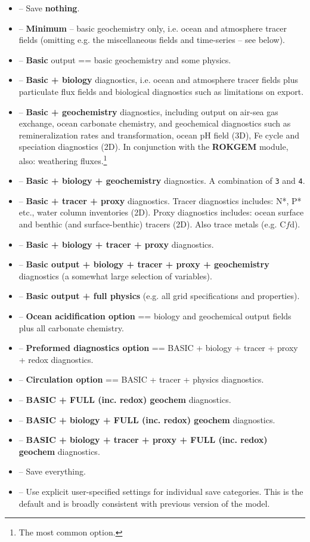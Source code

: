 \documentclass[11pt,fleqn]{book} %
\begin{document}
\vspace{2mm}\begin{itemize}

\item[0] -- Save \textbf{nothing}.
\item[1] -- \textbf{Minimum} -- basic geochemistry only, i.e. ocean and atmosphere tracer fields (omitting e.g. the miscellaneous fields and time-series -- see below).
\item[2] -- \textbf{Basic} output == basic geochemistry and some physics.
\item[3] -- \textbf{Basic + biology} diagnostics, i.e. ocean and atmosphere tracer fields plus particulate  flux fields and biological diagnostics such as limitations on export.
\item[4] -- \textbf{Basic + geochemistry} diagnostics, including output on air-sea gas exchange, ocean carbonate chemistry, and geochemical diagnostics such as remineralization rates and transformation, ocean pH field (3D), Fe cycle and speciation diagnostics (2D). In conjunction with the \textbf{ROKGEM} module, also: weathering fluxes.\footnote{The most common option.} \item[5] -- \textbf{Basic + biology + geochemistry} diagnostics. A combination of \texttt{3} and \texttt{4}.
\item[6] -- \textbf{Basic + tracer + proxy} diagnostics. Tracer diagnostics includes: N*, P* etc., water column inventories (2D). Proxy diagnostics includes: ocean surface and benthic (and surface-benthic) tracers (2D). Also trace metals (e.g. C\(f\)d).\item[7] -- \textbf{Basic + biology + tracer + proxy} diagnostics.
\item[8] -- \textbf{Basic output + biology + tracer + proxy + geochemistry} diagnostics (a somewhat large selection of variables).
\item[9] -- \textbf{Basic output + full physics} (e.g. all grid specifications and properties).
\item[10] -- \textbf{Ocean acidification option} == biology and geochemical output fields plus all carbonate chemistry.
\item[11] -- \textbf{Preformed diagnostics option} == BASIC + biology + tracer + proxy + redox diagnostics.
\item[12] -- \textbf{Circulation option} == BASIC + tracer + physics diagnostics.
\item[14] -- \textbf{ BASIC + FULL (inc. redox) geochem} diagnostics.
\item[15] -- \textbf{ BASIC + biology + FULL (inc. redox) geochem} diagnostics.
\item[16] -- \textbf{ BASIC + biology + tracer + proxy + FULL (inc. redox) geochem} diagnostics.
\item[99] -- Save everything.
\item[>99] -- Use explicit user-specified settings for individual save categories. This is the default and is broadly consistent with previous version of the model.

\end{itemize}\vspace{2mm}
\end{document}
